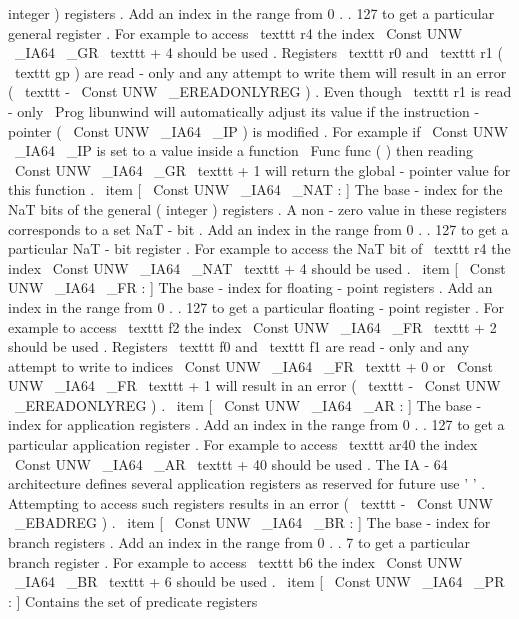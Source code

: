 integer
)
registers
.
Add
an
index
in
the
range
from
0
.
.
127
to
get
a
particular
general
register
.
For
example
to
access
\
texttt
{
r4
}
the
index
\
Const
{
UNW
\
_IA64
\
_GR
}
\
texttt
{
+
4
}
should
be
used
.
Registers
\
texttt
{
r0
}
and
\
texttt
{
r1
}
(
\
texttt
{
gp
}
)
are
read
-
only
and
any
attempt
to
write
them
will
result
in
an
error
(
\
texttt
{
-
}
\
Const
{
UNW
\
_EREADONLYREG
}
)
.
Even
though
\
texttt
{
r1
}
is
read
-
only
\
Prog
{
libunwind
}
will
automatically
adjust
its
value
if
the
instruction
-
pointer
(
\
Const
{
UNW
\
_IA64
\
_IP
}
)
is
modified
.
For
example
if
\
Const
{
UNW
\
_IA64
\
_IP
}
is
set
to
a
value
inside
a
function
\
Func
{
func
}
(
)
then
reading
\
Const
{
UNW
\
_IA64
\
_GR
}
\
texttt
{
+
1
}
will
return
the
global
-
pointer
value
for
this
function
.
\
item
[
\
Const
{
UNW
\
_IA64
\
_NAT
}
:
]
The
base
-
index
for
the
NaT
bits
of
the
general
(
integer
)
registers
.
A
non
-
zero
value
in
these
registers
corresponds
to
a
set
NaT
-
bit
.
Add
an
index
in
the
range
from
0
.
.
127
to
get
a
particular
NaT
-
bit
register
.
For
example
to
access
the
NaT
bit
of
\
texttt
{
r4
}
the
index
\
Const
{
UNW
\
_IA64
\
_NAT
}
\
texttt
{
+
4
}
should
be
used
.
\
item
[
\
Const
{
UNW
\
_IA64
\
_FR
}
:
]
The
base
-
index
for
floating
-
point
registers
.
Add
an
index
in
the
range
from
0
.
.
127
to
get
a
particular
floating
-
point
register
.
For
example
to
access
\
texttt
{
f2
}
the
index
\
Const
{
UNW
\
_IA64
\
_FR
}
\
texttt
{
+
2
}
should
be
used
.
Registers
\
texttt
{
f0
}
and
\
texttt
{
f1
}
are
read
-
only
and
any
attempt
to
write
to
indices
\
Const
{
UNW
\
_IA64
\
_FR
}
\
texttt
{
+
0
}
or
\
Const
{
UNW
\
_IA64
\
_FR
}
\
texttt
{
+
1
}
will
result
in
an
error
(
\
texttt
{
-
}
\
Const
{
UNW
\
_EREADONLYREG
}
)
.
\
item
[
\
Const
{
UNW
\
_IA64
\
_AR
}
:
]
The
base
-
index
for
application
registers
.
Add
an
index
in
the
range
from
0
.
.
127
to
get
a
particular
application
register
.
For
example
to
access
\
texttt
{
ar40
}
the
index
\
Const
{
UNW
\
_IA64
\
_AR
}
\
texttt
{
+
40
}
should
be
used
.
The
IA
-
64
architecture
defines
several
application
registers
as
reserved
for
future
use
'
'
.
Attempting
to
access
such
registers
results
in
an
error
(
\
texttt
{
-
}
\
Const
{
UNW
\
_EBADREG
}
)
.
\
item
[
\
Const
{
UNW
\
_IA64
\
_BR
}
:
]
The
base
-
index
for
branch
registers
.
Add
an
index
in
the
range
from
0
.
.
7
to
get
a
particular
branch
register
.
For
example
to
access
\
texttt
{
b6
}
the
index
\
Const
{
UNW
\
_IA64
\
_BR
}
\
texttt
{
+
6
}
should
be
used
.
\
item
[
\
Const
{
UNW
\
_IA64
\
_PR
}
:
]
Contains
the
set
of
predicate
registers

